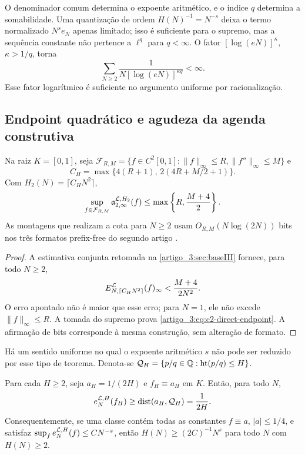 \begin{remark}\label{map:artigo_3:4.4}
\label{artigo_3:rem:q-height-role}
O denominador comum determina o expoente aritmético, e o índice $q$ determina
a somabilidade. Uma quantização de ordem
$H(N)^{-1}=N^{-s}$ deixa o termo normalizado $N^se_N$ apenas limitado; isso
é suficiente para o supremo, mas a sequência constante não pertence a
$\ell^q$ para $q<\infty$. O fator $[\log(eN)]^\kappa$, $\kappa>1/q$, torna
\[
 \sum_{N\ge2}\frac1{N[\log(eN)]^{\kappa q}}<\infty.
\]
Esse fator logarítmico é suficiente no argumento uniforme por
racionalização.
\end{remark}

\subsection{Endpoint quadrático e agudeza da agenda construtiva}

\begin{corollary}[endpoint $C^2$]\label{map:artigo_3:4.5}
\label{artigo_3:cor:c2-direct-endpoint}
Na raiz $K=[0,1]$, seja
$\mathcal F_{R,M}=\{f\in C^2[0,1]:\|f\|_\infty\le R,
\|f''\|_\infty\le M\}$ e
\[
 C_H=\max\{4(R+1),\,2(4R+M/2+1)\}.
\]
Com $H_2(N)=\lceil C_HN^2\rceil$,
\begin{equation}
 \sup_{f\in\mathcal F_{R,M}}
 \mathfrak a_{2,\infty}^{\mathcal{L},H_2}(f)
 \le\max\left\{R,\frac{M+4}{2}\right\}.
 \label{artigo_3:eq:c2-direct-endpoint}
\end{equation}
As montagens que realizam a cota para $N\ge2$ usam
$O_{R,M}(N\log(2N))$ bits nos três formatos prefix-free do
segundo artigo \citep{artigo_2-oliveiraII}.
\end{corollary}

\begin{proof}
A estimativa conjunta retomada na \cref{artigo_3:sec:baseIII} fornece, para todo $N\ge2$,
\[
 E_{N,\lceil C_HN^2\rceil}^{\mathcal{L}}(f)_\infty
 <\frac{M+4}{2N^2}.
\]
O erro apontado não é maior que esse erro; para $N=1$, ele não excede
$\|f\|_\infty\le R$. A tomada do supremo prova
\eqref{artigo_3:eq:c2-direct-endpoint}. A afirmação de bits corresponde à mesma construção,
sem alteração de formato.
\end{proof}

Há um sentido uniforme no qual o expoente aritmético $s$ não pode ser
reduzido por esse tipo de teorema. Denota-se
$\mathcal Q_H=\{p/q\in\mathbb Q:\operatorname{ht}(p/q)\le H\}$.

\begin{proposition}\label{map:artigo_3:4.6}
\label{artigo_3:prop:arithmetic-floor}
Para cada $H\ge2$, seja $a_H=1/(2H)$ e $f_H\equiv a_H$ em $K$. Então, para
todo $N$,
\begin{equation}
 e_N^{\mathcal{L},H}(f_H)
 \ge\operatorname{dist}(a_H,\mathcal Q_H)
 =\frac1{2H}.
 \label{artigo_3:eq:arithmetic-floor}
\end{equation}
Consequentemente, se uma classe contém todas as constantes
$f\equiv a$, $|a|\le1/4$, e satisfaz
$\sup_f e_N^{\mathcal{L},H}(f)\le C N^{-s}$, então
$H(N)\ge(2C)^{-1}N^s$ para todo $N$ com $H(N)\ge2$.
\end{proposition}

